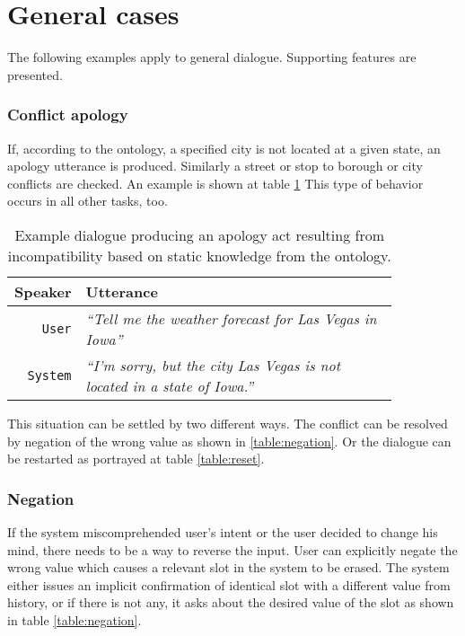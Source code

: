\section{General cases }

The following examples apply to general dialogue.
Supporting features are presented.

\subsubsection{Conflict apology}

If, according to the ontology, a specified city is not located at a given state, an apology utterance is produced.
Similarly a street or stop to borough or city conflicts are checked.
An example is shown at table \ref{table:conflict}
This type of behavior occurs in all other tasks, too.

\begin{table}[h]
\centering
\begin{tabular}{ | r | p{0.85\linewidth} | } \hline
	Speaker & Utterance \\ \hline
	\texttt{User} & \textit{``Tell me the weather forecast for Las Vegas in Iowa''} \\ \hline
	\texttt{System} & \textit{``I'm sorry, but the city Las Vegas is not located in a state of Iowa.''} \\ \hline
\end{tabular}
\caption[Conflict example of incompatible waypoints]{Example dialogue producing an apology act resulting from incompatibility based on static knowledge from the ontology.}
\label{table:conflict}
\end{table}

This situation can be settled by two different ways.
The conflict can be resolved by negation of the wrong value as shown in \ref{table:negation}.
Or the dialogue can be restarted as portrayed at table \ref{table:reset}.

\subsubsection{Negation}

If the system miscomprehended user's intent or the user decided to change his mind, there needs to be a way to reverse the input.
User can explicitly negate the wrong value which causes a relevant slot in the system to be erased.
The system either issues an implicit confirmation of identical slot with a different value from history, or if there is not any, it asks about the desired value of the slot as shown in table \ref{table:negation}.

